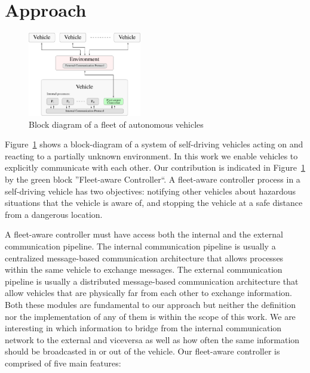 \section{Approach}
\label{sec:solution}

\begin{figure}[t]
    \centering
    \vspace{0.2cm}
    \includegraphics[width=0.44\textwidth]{figures/model.pdf}
    \caption{Block diagram of a fleet of autonomous vehicles  \label{fig:model_block_diagram}}
\end{figure}

Figure~\ref{fig:model_block_diagram} shows a block-diagram of a system of self-driving vehicles acting on and reacting to
a partially unknown environment. In this work we enable vehicles to explicitly communicate with each other. Our contribution
is indicated in Figure~\ref{fig:model_block_diagram} by the green block ''Fleet-aware Controller``.
A fleet-aware controller process in a self-driving vehicle has two objectives: notifying other vehicles about
hazardous situations that the vehicle is aware of, and stopping the vehicle at a safe distance from a dangerous location.

A fleet-aware controller must have access both the internal and the external communication pipeline. The internal communication
pipeline is usually a centralized message-based communication architecture that allows processes within the same vehicle to exchange
messages. The external communication pipeline is usually a distributed message-based communication architecture that allow
vehicles that are physically far from each other to exchange information. 
Both these modules are fundamental to our approach but neither the definition nor the implementation of any of them is within
the scope of this work.
We are interesting in which information to bridge from the internal communication network to the external and viceversa as well as
how often the same information should be broadcasted in or out of the vehicle.
Our fleet-aware controller is comprised of five main features:

